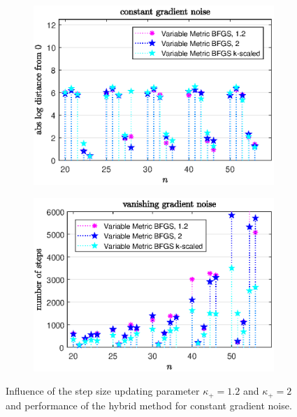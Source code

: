 \vspace{-1.5em}

\begin{figure}[H]
	\begin{subfigure}{0.49\textwidth}
		\includegraphics[width=\textwidth]{Pictures/Plots/constant_gradient_noise_compb.eps}%
	\end{subfigure}
	\begin{subfigure}{0.49\textwidth}
		\includegraphics[width=\textwidth]{Pictures/Plots/steps_constant_gradient_noise_compb.eps}%
	\end{subfigure}
	\caption{Influence of the step size updating parameter \(\kappa_+ = 1.2\) and \(\kappa_+ =2 \) and performance of the hybrid method for constant gradient noise.}%
	\label{fig_const_grad_noise_comp_large_large}%
\end{figure}

